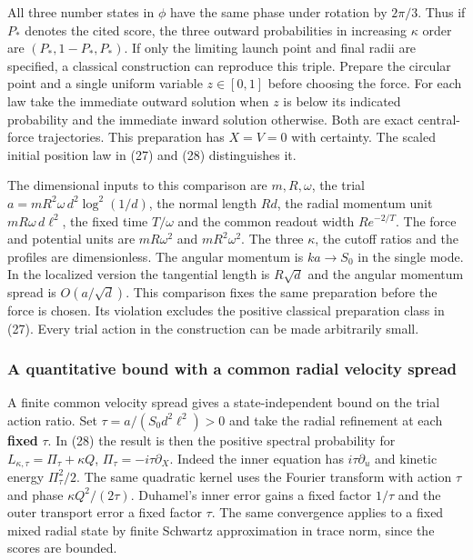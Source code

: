 \documentclass[11pt,a4paper]{article}
\begin{document}
All three number states in \(\phi\) have the same phase under rotation
by \(2\pi/3\). Thus if \(P_*\) denotes the cited score, the three
outward probabilities in increasing \(\kappa\) order are
\((P_*,1-P_*,P_*)\). If only the limiting launch point and final radii
are specified, a classical construction can reproduce this triple.
Prepare the circular point and a single uniform variable \(z\in[0,1]\)
before choosing the force. For each law take the immediate outward
solution when \(z\) is below its indicated probability and the immediate
inward solution otherwise. Both are exact central-force trajectories.
This preparation has \(X=V=0\) with certainty. The scaled initial
position law in (27) and (28) distinguishes it.

The dimensional inputs to this comparison are \(m,R,\omega\), the trial
\(a=mR^2\omega\,d^2\log^2(1/d)\), the normal length \(Rd\), the radial
momentum unit \(mR\omega\,d\ell^2\), the fixed time \(T/\omega\) and the
common readout width \(R e^{-2/T}\). The force and potential units are
\(mR\omega^2\) and \(mR^2\omega^2\). The three \(\kappa\), the cutoff
ratios and the profiles are dimensionless. The angular momentum is
\(k a\to S_0\) in the single mode. In the localized version the
tangential length is \(R\sqrt d\) and the angular momentum spread is
\(O(a/\sqrt d)\). This comparison fixes the same preparation before the
force is chosen. Its violation excludes the positive classical
preparation class in (27). Every trial action in the construction can be
made arbitrarily small.

\subsubsection{A quantitative bound with a common radial velocity
spread}\label{a-quantitative-bound-with-a-common-radial-velocity-spread}

A finite common velocity spread gives a state-independent bound on the
trial action ratio. Set \(\tau=a/(S_0d^2\ell^2)>0\) and take the radial
refinement at each \textbf{fixed} \(\tau\). In (28) the result is then
the positive spectral probability for
\(L_{\kappa,\tau}=\Pi_\tau+\kappa Q\), \(\Pi_\tau=-i\tau\partial_X\).
Indeed the inner equation has \(i\tau\partial_u\) and kinetic energy
\(\Pi_\tau^2/2\). The same quadratic kernel uses the Fourier transform
with action \(\tau\) and phase \(\kappa Q^2/(2\tau)\). Duhamel's inner
error gains a fixed factor \(1/\tau\) and the outer transport error a
fixed factor \(\tau\). The same convergence applies to a fixed mixed
radial state by finite Schwartz approximation in trace norm, since the
scores are bounded.
\end{document}
